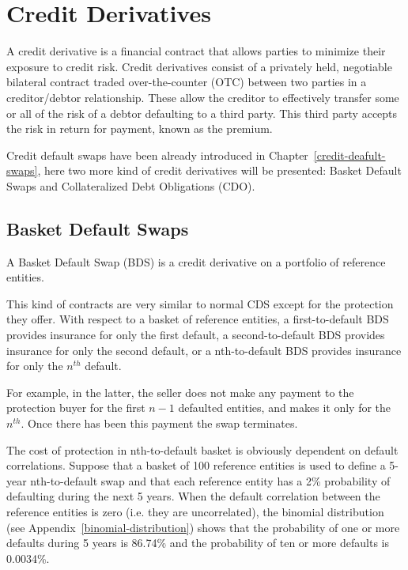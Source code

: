 \chapter{Credit Derivatives}

A credit derivative is a financial contract that allows parties to minimize their exposure to credit risk. Credit derivatives consist of a privately held, negotiable bilateral contract traded over-the-counter (OTC) between two parties in a creditor/debtor relationship. These allow the creditor to effectively transfer some or all of the risk of a debtor defaulting to a third party. This third party accepts the risk in return for payment, known as the premium.

Credit default swaps have been already introduced in Chapter~\ref{credit-deafult-swaps}, here two more kind of credit derivatives will be presented: Basket Default Swaps and Collateralized Debt Obligations (CDO).

\section{Basket Default Swaps}
\label{basket-default-swaps}

A Basket Default Swap (BDS) is a credit derivative on a portfolio of reference entities.

This kind of contracts are very similar to normal CDS except for the protection they offer. With respect to a basket of reference entities, a first-to-default BDS provides insurance for only the first default, a second-to-default BDS provides insurance for only the second default, or a nth-to-default BDS provides insurance for only the $n^{th}$ default. 

For example, in the latter, the seller does not make any payment to the protection buyer for the first $n-1$ defaulted entities, and makes it only for the $n^{th}$. Once there has been this payment the swap terminates.

The cost of protection in nth-to-default basket is obviously dependent on default correlations. Suppose that a basket of 100 reference entities is used to define a 5-year nth-to-default swap and that each reference entity has a 2\% probability of defaulting during the next 5 years. When the default correlation between the reference entities is zero (i.e. they are uncorrelated), the binomial distribution (see Appendix~\ref{binomial-distribution}) shows that the probability of one or more defaults during 5 years is 86.74\% and the probability of ten or more defaults is 0.0034\%.

